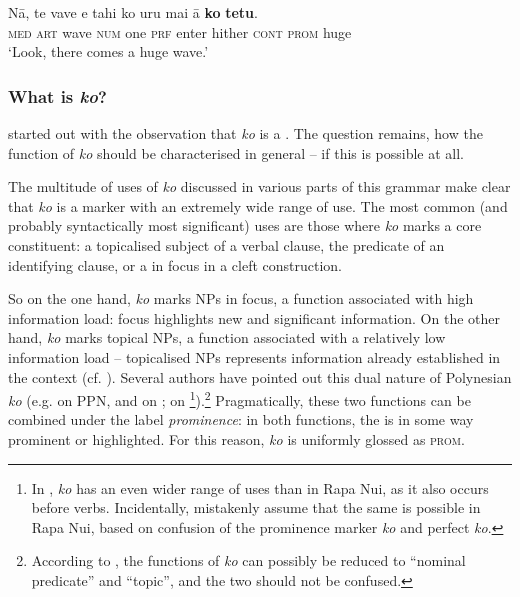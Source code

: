 \ea\label{ex:4.328}
\gll Nā, te vave e tahi ko uru mai {\ꞌ}ā \textbf{ko} \textbf{tetu}. \\
\textsc{med} \textsc{art} wave \textsc{num} one \textsc{prf} enter hither \textsc{cont} \textsc{prom} huge \\

\glt 
‘Look, there comes a huge wave.’ \textstyleExampleref{[R243.028]} 
\z

\subsubsection[What is ko?]{What is \textit{ko}?}\label{sec:4.7.11.4}

 started out with the observation that \textit{ko} is a . The question remains, how the function of \textit{ko} should be characterised in general – if this is possible at all.

The multitude of uses of \textit{ko} discussed in various parts of this grammar make clear that \textit{ko} is a marker with an extremely wide range of use. The most common (and probably syntactically most significant) uses are those where \textit{ko} marks a core constituent: a topicalised subject of a verbal clause, the predicate of an identifying clause, or a  in focus in a cleft construction.

So on the one hand, \textit{ko} marks NPs in focus, a function associated with high information load: focus highlights new and significant information. On the other hand, \textit{ko} marks topical NPs, a function associated with a relatively low information load – topicalised NPs represents information already established in the context (cf. \citealt[51–52]{Levinsohn2007}). Several authors have pointed out this dual nature of Polynesian \textit{ko} (e.g. \citealt{Clark1976} on PPN, \citealt{Bauer1991} and \citealt{Pearce1999} on ; \citealt{MassamLee2006} on \footnote{\label{fn:244}In , \textit{ko} has an even wider range of uses than in Rapa Nui, as it also occurs before verbs. Incidentally, \citet[15]{MassamLee2006} mistakenly assume that the same is possible in Rapa Nui, based on confusion of the prominence marker \textit{ko} and perfect \textit{ko}.}).\footnote{\label{fn:245}According to \citet[46]{Clark1976}, the functions of \textit{ko} can possibly be reduced to “nominal predicate” and “topic”, and the two should not be confused.} Pragmatically, these two functions can be combined under the label \textit{prominence}: in both functions, the  is in some way prominent or highlighted. For this reason, \textit{ko} is uniformly glossed as \textsc{prom}.

